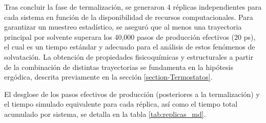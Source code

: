 \begin{figure}[p]
{
    }
\end{figure}

Tras concluir la fase de termalización, se generaron 4 réplicas independientes para cada sistema en función de la disponibilidad de recursos computacionales. Para garantizar un muestreo estadístico, se aseguró que al menos una trayectoria principal por solvente superara los 40,000 pasos de producción efectivos (20 ps), el cual es un tiempo estándar y adecuado para el análisis de estos fenómenos de solvatación. La obtención de propiedades fisicoquímicas y estructurales a partir de la combinación de distintas trayectorias se fundamenta en la hipótesis ergódica, descrita previamente en la sección \ref{section-Termostatos}. 

El desglose de los pasos efectivos de producción (posteriores a la termalización) y el tiempo simulado equivalente para cada réplica, así como el tiempo total acumulado por sistema, se detalla en la tabla \ref{tab:replicas_md}.

